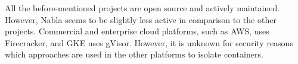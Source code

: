 All the before-mentioned projects are open source and actively maintained. However, Nabla seems to be slightly less active in comparison to the other projects. Commercial and enterprise cloud platforms, such as AWS, uses Firecracker, and GKE uses gVisor. However, it is unknown for security reasons which approaches are used in the other platforms to isolate containers.


